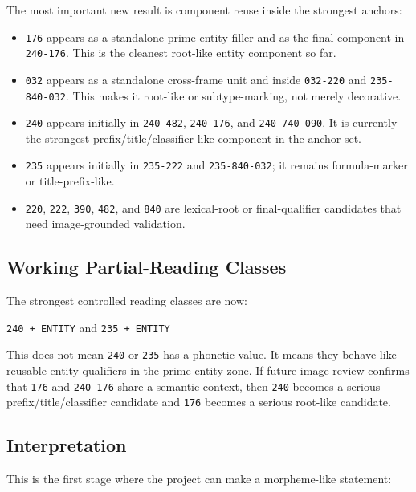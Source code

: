 The most important new result is component reuse inside the strongest anchors:

\begin{itemize}
  \item \texttt{176} appears as a standalone prime-entity filler and as the final component in \texttt{240-176}. This is the cleanest root-like entity component so far.
  \item \texttt{032} appears as a standalone cross-frame unit and inside \texttt{032-220} and \texttt{235-840-032}. This makes it root-like or subtype-marking, not merely decorative.
  \item \texttt{240} appears initially in \texttt{240-482}, \texttt{240-176}, and \texttt{240-740-090}. It is currently the strongest prefix/title/classifier-like component in the anchor set.
  \item \texttt{235} appears initially in \texttt{235-222} and \texttt{235-840-032}; it remains formula-marker or title-prefix-like.
  \item \texttt{220}, \texttt{222}, \texttt{390}, \texttt{482}, and \texttt{840} are lexical-root or final-qualifier candidates that need image-grounded validation.
\end{itemize}

\subsection{Working Partial-Reading Classes}

The strongest controlled reading classes are now:

\begin{center}
\texttt{240 + ENTITY} \quad and \quad \texttt{235 + ENTITY}
\end{center}

This does not mean \texttt{240} or \texttt{235} has a phonetic value. It means they behave like reusable entity qualifiers in the prime-entity zone. If future image review confirms that \texttt{176} and \texttt{240-176} share a semantic context, then \texttt{240} becomes a serious prefix/title/classifier candidate and \texttt{176} becomes a serious root-like candidate.

\subsection{Interpretation}

This is the first stage where the project can make a morpheme-like statement:

